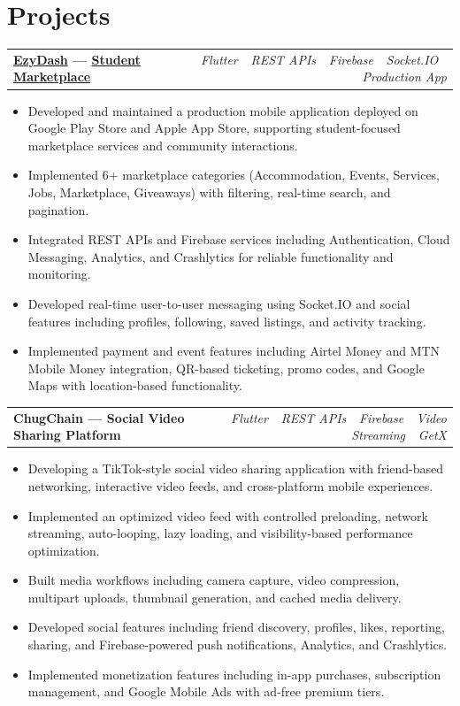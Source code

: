\documentclass[10.5pt, a4paper]{article}
\makeatletter
\newcommand{\projentry}[2]{%
  \vspace{3pt}%
  \begin{tabularx}{\linewidth}{@{}X r@{}}
    \textbf{#1} & {\small\itshape\color{csteel}#2}
  \end{tabularx}%
  \vspace{1pt}%
}
\makeatother
\begin{document}
\section{Projects}

\projentry{\href{https://play.google.com/store/apps/details?id=com.ezydash\&hl=en}{EzyDash} --- \href{https://apps.apple.com/in/app/ezydash-student-marketplace/id6749002165}{Student Marketplace}}{Flutter \,\textbullet\, REST APIs \,\textbullet\, Firebase \,\textbullet\, Socket.IO \,\textbullet\, Production App}
\begin{itemize}
  \item Developed and maintained a production mobile application deployed on Google Play Store and Apple App Store, supporting student-focused marketplace services and community interactions.
  \item Implemented 6+ marketplace categories (Accommodation, Events, Services, Jobs, Marketplace, Giveaways) with filtering, real-time search, and pagination.
  \item Integrated REST APIs and Firebase services including Authentication, Cloud Messaging, Analytics, and Crashlytics for reliable functionality and monitoring.
  \item Developed real-time user-to-user messaging using Socket.IO and social features including profiles, following, saved listings, and activity tracking.
  \item Implemented payment and event features including Airtel Money and MTN Mobile Money integration, QR-based ticketing, promo codes, and Google Maps with location-based functionality.
\end{itemize}

\vspace{4pt}

\projentry{ChugChain --- Social Video Sharing Platform}{Flutter \,\textbullet\, REST APIs \,\textbullet\, Firebase \,\textbullet\, Video Streaming \,\textbullet\, GetX}
\begin{itemize}
  \item Developing a TikTok-style social video sharing application with friend-based networking, interactive video feeds, and cross-platform mobile experiences.
  \item Implemented an optimized video feed with controlled preloading, network streaming, auto-looping, lazy loading, and visibility-based performance optimization.
  \item Built media workflows including camera capture, video compression, multipart uploads, thumbnail generation, and cached media delivery.
  \item Developed social features including friend discovery, profiles, likes, reporting, sharing, and Firebase-powered push notifications, Analytics, and Crashlytics.
  \item Implemented monetization features including in-app purchases, subscription management, and Google Mobile Ads with ad-free premium tiers.
\end{itemize}
\end{document}

